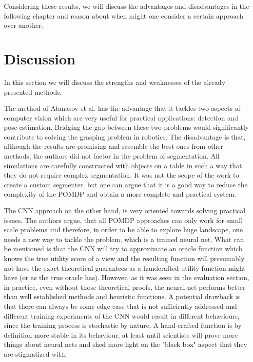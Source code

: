 \documentclass[12pt,twoside]{article}
\theoremstyle{plain}
\theoremstyle{definition}
\theoremstyle{remark}
\begin{document}
Considering these results, we will discuss the advantages and disadvantages in the following chapter and reason about when might one consider a certain approach over another.


\section{Discussion}

In this section we will discuss the strengths and weaknesses of the already presented methods.

The method of Atanasov et al. \cite{atanasov2014nonmyopic} has the advantage that it tackles two aspects of computer vision which are very useful for practical applications: detection and pose estimation. Bridging the gap between these two problems would significantly contribute to solving the grasping problem in robotics. The disadvantage is that, although the results are promising and resemble the best ones from other methods, the authors did not factor in the problem of segmentation. All simulations are carefully constructed with objects on a table in such a way that they do not require complex segmentation. It was not the scope of the work to create a custom segmenter, but one can argue that it is a good way to reduce the complexity of the POMDP and obtain a more complete and practical system.

The CNN approach on the other hand, is very oriented towards solving practical issues. The authors argue, that all POMDP approaches can only work for small scale problems and therefore, in order to be able to explore huge landscape, one needs a new way to tackle the problem, which is a trained neural net. What can be mentioned is that the CNN will try to approximate an oracle function which knows the true utility score of a view and the resulting function will presumably not have the exact theoretical guarantees as a handcrafted utility function might have (or as the true oracle has). However, as it was seen in the evaluation section, in practice, even without those theoretical proofs, the neural net performs better than well established methods and heuristic functions. A potential drawback is that there can always be some edge case that is not sufficiently addressed and different training experiments of the CNN would result in different behaviours, since the training process is stochastic by nature. A hand-crafted function is by definition more stable in its behaviour, at least until scientists will prove more things about neural nets and shed more light on the "black box" aspect that they are stigmatized with.
\end{document}
